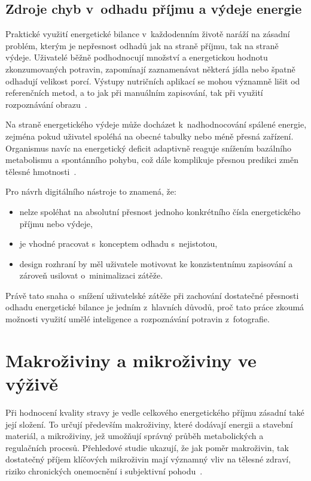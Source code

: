 \subsection{Zdroje chyb v~odhadu příjmu a výdeje energie}
\label{subsec:zdrojeChyb}

Praktické využití energetické bilance v~každodenním životě naráží na zásadní problém, kterým je nepřesnost odhadů jak na straně příjmu, tak na straně výdeje.
Uživatelé běžně podhodnocují množství a energetickou hodnotu zkonzumovaných potravin, zapomínají zaznamenávat některá jídla nebo špatně odhadují velikost porcí.
Výstupy nutričních aplikací se mohou významně lišit od referenčních metod, a to jak při manuálním zapisování, tak při využití rozpoznávání obrazu~\cite{li2024evaluating}.

Na straně energetického výdeje může docházet k~nadhodnocování spálené energie, zejména pokud uživatel spoléhá na obecné tabulky nebo méně přesná zařízení.
Organismus navíc na energetický deficit adaptivně reaguje snížením bazálního metabolismu a spontánního pohybu, což dále komplikuje přesnou predikci změn tělesné hmotnosti~\cite{theodorakis2025humanEnergyBalance}.

Pro návrh digitálního nástroje to znamená, že:

\begin{itemize}
	\item nelze spoléhat na absolutní přesnost jednoho konkrétního čísla energetického příjmu nebo výdeje,
	\item je vhodné pracovat s~konceptem odhadu s~nejistotou,
	\item design rozhraní by měl uživatele motivovat ke konzistentnímu zapisování a zároveň usilovat o~minimalizaci zátěže.
\end{itemize}

Právě tato snaha o~snížení uživatelské zátěže při zachování dostatečné přesnosti odhadu energetické bilance je jedním z~hlavních důvodů, proč tato práce zkoumá možnosti využití umělé inteligence a rozpoznávání potravin z~fotografie.

\section{Makroživiny a mikroživiny ve výživě}
\label{sec:zivoiny}

Při hodnocení kvality stravy je vedle celkového energetického příjmu zásadní také její složení.
To určují především makroživiny, které dodávají energii a stavební materiál, a mikroživiny, jež umožňují správný průběh metabolických a regulačních procesů.
Přehledové studie ukazují, že jak poměr makroživin, tak dostatečný příjem klíčových mikroživin mají významný vliv na tělesné zdraví, riziko chronických onemocnění i subjektivní pohodu~\cite{venn2020macronutrients,farag2021dietaryMicronutrients}.

